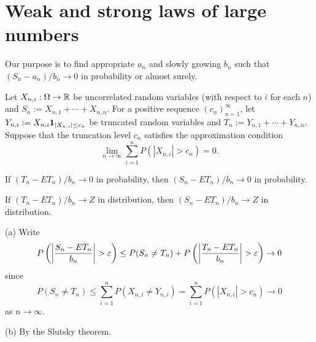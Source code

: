 \documentclass{../note}
\begin{document}
\section{Weak and strong laws of large numbers}

Our purpose is to find appropriate $a_n$ and slowly growing $b_n$ such that $(S_n-a_n)/b_n\to0$ in probability or almost surely.


\begin{prb}
Let $X_{n,i}:\Omega\to\mathbb{R}$ be uncorrelated random variables (with respect to $i$ for each $n$) and $S_n:=X_{n,1}+\cdots+X_{n,n}$.
For a positive sequence $(c_n)_{n=1}^\infty$, let $Y_{n,i}:=X_{n,i}\mathbf{1}_{|X_{n,i}|\le c_n}$ be truncated random variables and $T_n:=Y_{n,1}+\cdots+Y_{n,n}$.
Suppose that the truncation level $c_n$ satisfies the approximation condition
\[\lim_{n\to\infty}\sum_{i=1}^nP(|X_{n,i}|>c_n)=0.\]
\begin{parts}
\item If $(T_n-ET_n)/b_n\to0$ in probability, then $(S_n-ET_n)/b_n\to0$ in probability.
\item If $(T_n-ET_n)/b_n\to Z$ in distribution, then $(S_n-ET_n)/b_n\to Z$ in distribution.
\end{parts}
\end{prb}
\begin{pf}
(a)
Write
\[P\left(\left|\frac{S_n-ET_n}{b_n}\right|>\e\right)
\le P(S_n\ne T_n)+P\left(\left|\frac{T_n-ET_n}{b_n}\right|>\e\right)\to0\]
since
\[P(S_n\ne T_n)\le\sum_{i=1}^nP(X_{n,i}\ne Y_{n,i})=\sum_{i=1}^nP(|X_{n,i}|>c_n)\to0\]
as $n\to\infty$.

(b)
By the Slutsky theorem.
\end{pf}
\end{document}
